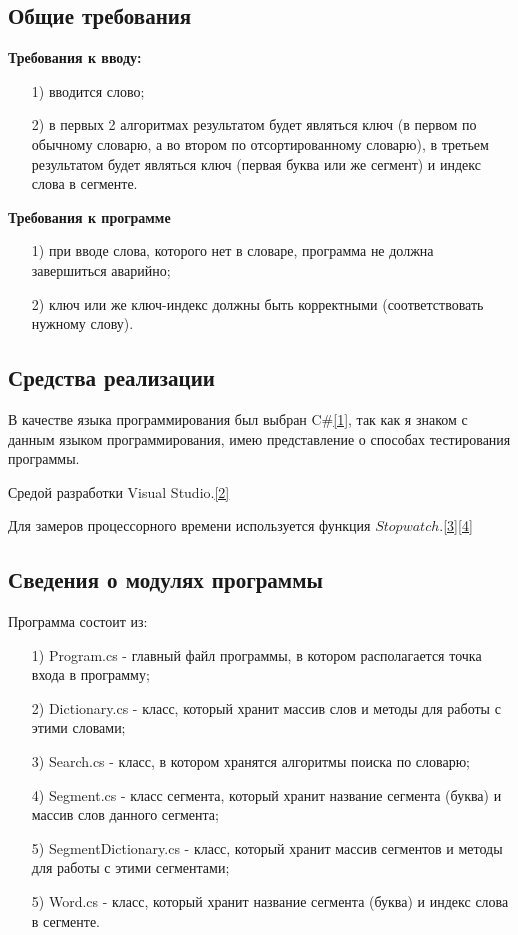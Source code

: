 \documentclass[14pt, a4paper]{extarticle}
\begin{document}
\subsection{Общие требования}
\textbf{Требования к вводу:}
\begin{enumerate}
	\item[1)] вводится слово;
	\item[2)] в первых 2 алгоритмах результатом будет являться ключ (в первом по обычному словарю, а во втором по отсортированному словарю), в третьем результатом будет являться ключ (первая буква или же сегмент) и индекс слова в сегменте. 
\end{enumerate}\par
\textbf{Требования к программе}
\begin{enumerate}
	\item[1)] при вводе слова, которого нет в словаре, программа не должна завершиться аварийно;
	\item[2)] ключ или же ключ-индекс должны быть корректными (соответствовать нужному слову).
\end{enumerate}
\subsection{Средства реализации}
В качестве языка программирования был выбран C\#\hyperref[literature]{[1]}, так как я знаком с данным языком программирования, имею представление о способах тестирования программы.\par
Средой разработки Visual Studio.\hyperref[literature]{[2]}\par 
Для замеров процессорного времени используется функция $Stopwatch$.\hyperref[literature]{[3]}\hyperref[literature]{[4]}\par
\subsection{Сведения о модулях программы}
Программа состоит из:
\begin{enumerate}
	\item[1)] Program.cs - главный файл программы, в котором располагается точка входа в программу;
	\item[2)] Dictionary.cs - класс, который хранит массив слов и методы для работы с этими словами;
	\item[3)] Search.cs - класс, в котором хранятся алгоритмы поиска по словарю;
	\item[4)] Segment.cs - класс сегмента, который хранит название сегмента (буква) и массив слов данного сегмента;
	\item[5)] SegmentDictionary.cs - класс, который хранит массив сегментов и методы для работы с этими сегментами;
	\item[5)] Word.cs - класс, который хранит название сегмента (буква) и индекс слова в сегменте.
\end{enumerate}
\end{document}
